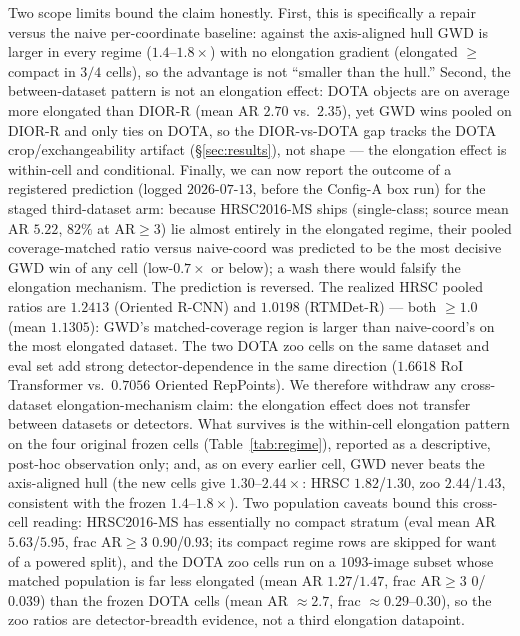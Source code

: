 \documentclass[11pt]{article}
\begin{document}
Two scope limits bound the claim honestly. First, this is specifically a repair versus the naive
per-coordinate baseline: against the axis-aligned hull GWD is larger in every regime
($1.4$--$1.8\times$) with no elongation gradient (elongated $\ge$ compact in $3/4$ cells), so the
advantage is not ``smaller than the hull.'' Second, the between-dataset pattern is not an
elongation effect: DOTA objects are on average more elongated than DIOR-R (mean AR $2.70$ vs.\
$2.35$), yet GWD wins pooled on DIOR-R and only ties on DOTA, so the DIOR-vs-DOTA gap tracks the DOTA
crop/exchangeability artifact (\S\ref{sec:results}), not shape --- the elongation effect is
within-cell and conditional. Finally, we can now report the outcome of a registered prediction
(logged $2026$-$07$-$13$, before the Config-A box run) for the staged third-dataset arm: because
HRSC2016-MS ships (single-class; source mean AR $5.22$, $82\%$ at $\mathrm{AR}\ge3$) lie almost entirely in
the elongated regime, their pooled coverage-matched ratio versus naive-coord was predicted to be the
most decisive GWD win of any cell (low-$0.7\times$ or below); a wash there would falsify the elongation
mechanism. The prediction is reversed. The realized HRSC pooled ratios are $1.2413$ (Oriented
R-CNN) and $1.0198$ (RTMDet-R) --- both $\ge 1.0$ (mean $1.1305$): GWD's matched-coverage region is
larger than naive-coord's on the most elongated dataset. The two DOTA zoo cells on the same dataset
and eval set add strong detector-dependence in the same direction ($1.6618$ RoI Transformer vs.\ $0.7056$
Oriented RepPoints). We therefore withdraw any cross-dataset elongation-mechanism claim: the elongation
effect does not transfer between datasets or detectors. What survives is the within-cell
elongation pattern on the four original frozen cells (Table~\ref{tab:regime}), reported as a descriptive,
post-hoc observation only; and, as on every earlier cell, GWD never beats the axis-aligned hull (the new
cells give $1.30$--$2.44\times$: HRSC $1.82$/$1.30$, zoo $2.44$/$1.43$, consistent with the frozen
$1.4$--$1.8\times$). Two population caveats bound this cross-cell reading: HRSC2016-MS has essentially no
compact stratum (eval mean AR $5.63$/$5.95$, frac $\mathrm{AR}\ge3$ $0.90$/$0.93$; its compact regime rows
are skipped for want of a powered split), and the DOTA zoo cells run on a $1093$-image subset whose matched
population is far less elongated (mean AR $1.27$/$1.47$, frac $\mathrm{AR}\ge3$ $0$/$0.039$) than the
frozen DOTA cells (mean AR $\approx2.7$, frac $\approx0.29$--$0.30$), so the zoo ratios are detector-breadth
evidence, not a third elongation datapoint.
\end{document}
